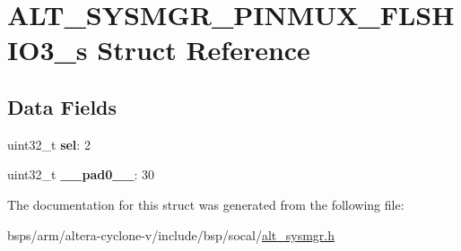 \hypertarget{structALT__SYSMGR__PINMUX__FLSHIO3__s}{}\section{A\+L\+T\+\_\+\+S\+Y\+S\+M\+G\+R\+\_\+\+P\+I\+N\+M\+U\+X\+\_\+\+F\+L\+S\+H\+I\+O3\+\_\+s Struct Reference}
\label{structALT__SYSMGR__PINMUX__FLSHIO3__s}
\subsection*{Data Fields}
\begin{DoxyCompactItemize}
\item 
\mbox{\label{structALT__SYSMGR__PINMUX__FLSHIO3__s_a3fda6c1dcc6f73c102c6a25e642916e8}} 
uint32\+\_\+t {\bfseries sel}\+: 2
\item 
\mbox{\label{structALT__SYSMGR__PINMUX__FLSHIO3__s_a4188042ffd2b227f85004d6f4aab6c5b}} 
uint32\+\_\+t {\bfseries \+\_\+\+\_\+pad0\+\_\+\+\_\+}\+: 30
\end{DoxyCompactItemize}


The documentation for this struct was generated from the following file\+:\begin{DoxyCompactItemize}
\item 
bsps/arm/altera-\/cyclone-\/v/include/bsp/socal/\mbox{\hyperlink{alt__sysmgr_8h}{alt\+\_\+sysmgr.\+h}}\end{DoxyCompactItemize}
